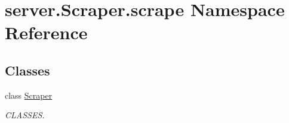 \hypertarget{namespaceserver_1_1_scraper_1_1scrape}{}\section{server.\+Scraper.\+scrape Namespace Reference}
\label{namespaceserver_1_1_scraper_1_1scrape}
\subsection*{Classes}
\begin{DoxyCompactItemize}
\item 
class \mbox{\hyperlink{classserver_1_1_scraper_1_1scrape_1_1_scraper}{Scraper}}
\begin{DoxyCompactList}\small\item\em C\+L\+A\+S\+S\+ES. \end{DoxyCompactList}\end{DoxyCompactItemize}
